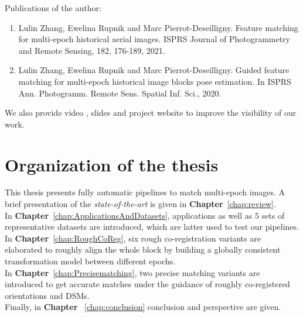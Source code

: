 \par
Publications of the author:
\begin{enumerate}
	\item Lulin Zhang, Ewelina Rupnik and Marc Pierrot-Deseilligny. Feature matching for multi-epoch historical aerial images. ISPRS Journal of Photogrammetry and Remote Sensing, 182, 176-189, 2021.
	\item Lulin Zhang, Ewelina Rupnik and Marc Pierrot-Deseilligny.	Guided feature matching for multi-epoch historical image blocks pose estimation. In ISPRS Ann. Photogramm. Remote Sens. Spatial Inf. Sci., 2020.
\end{enumerate}
We also provide video \cite{HistoPVideo}, slides \cite{HistoPSlides} and project website \cite{HistoPProj} to improve the visibility of our work.

\section{Organization of the thesis}
This thesis presents fully automatic pipelines to match multi-epoch images.
A brief presentation of the \textit{state-of-the-art} is given in \textbf{Chapter}~\ref{chap:review}. \\

In \textbf{Chapter}~\ref{chap:ApplicationsAndDatasets}, applications as well as 5 sets of representative datasets are introduced, which are latter used to test our pipelines.\\

In \textbf{Chapter}~\ref{chap:RoughCoReg}, six rough co-registration variants are elaborated to roughly align the whole block by building a globally consistent transformation model between different epochs.\\

In \textbf{Chapter}~\ref{chap:Precisematching}, two precise matching variants are introduced to get accurate matches under the guidance of roughly co-registered orientations and \ac{DSM}s.\\

Finally, in \textbf{Chapter} ~\ref{chap:conclusion} conclusion and perspective are given.\\

